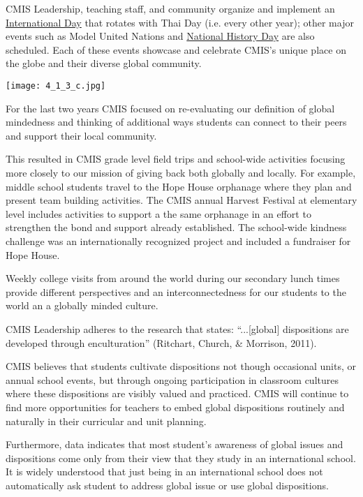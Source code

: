 \begin{findings}
CMIS Leadership, teaching staff, and community organize and implement an \href{https://docs.google.com/a/cmis.ac.th/document/d/1YGCBI_uQVVcvOvw4c_Q2GcoJQzadFou1_6WtBAMTTaE/edit?usp=sharing}{International Day} that rotates with Thai Day (i.e. every other year); other major events such as Model United Nations and \href{https://docs.google.com/a/cmis.ac.th/presentation/d/1U8ieEOjf4gWWTdg-IU8Twcm2qywiETSM0itGHsq7oTg/edit?usp=sharing}{National History Day} are also scheduled. Each of these events showcase and celebrate CMIS’s unique place on the globe and their diverse global community. 

{\centering\texttt{[image: 4\_1\_3\_c.jpg]}}

For the last two years CMIS focused on re-evaluating our definition of global mindedness and thinking of additional ways students can connect to their peers and support their local community.

This resulted in CMIS grade level field trips and school-wide activities focusing more closely to our mission of giving back both globally and locally. For example, middle school students travel to the Hope House orphanage where they plan and present team building activities. The CMIS annual Harvest Festival at elementary level includes activities to support a the same orphanage in an effort to strengthen the bond and support already established. The school-wide kindness challenge was an internationally recognized project and included a fundraiser for Hope House.

Weekly college visits from around the world during our secondary lunch times provide different perspectives and an interconnectedness for our students to the world an a globally minded culture.


CMIS Leadership adheres to the research that states: ``...[global] dispositions are developed through enculturation'' (Ritchart, Church, \& Morrison, 2011). 

CMIS believes that students cultivate dispositions not though occasional units, or annual school events, but through ongoing participation in classroom cultures where these dispositions are visibly valued and practiced. CMIS will continue to find more opportunities for teachers to embed global dispositions routinely and naturally in their curricular and unit planning. 

Furthermore, data indicates that most student’s awareness of global issues and dispositions come only from their view that they study in an international school. It is widely understood that just being in an international school does not automatically ask student to address global issue or use global dispositions.
\end{findings}

